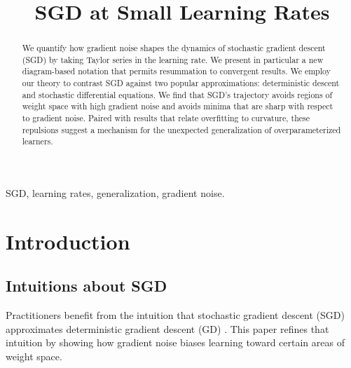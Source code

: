 \documentclass[final,12pt]{colt2021} %
\title[SGD at Small Learning Rates]{SGD at Small Learning Rates}
\begin{document}
    \maketitle
    
    \begin{abstract}%
        We quantify how gradient noise shapes the dynamics of stochastic
        gradient descent (SGD) by taking Taylor series in the learning rate.
        We present in particular a new diagram-based notation that permits
        resummation to convergent results.
        We employ our theory to contrast SGD against two popular
        approximations: deterministic descent and stochastic differential
        equations.  We find that SGD's trajectory avoids regions of weight
        space with high gradient noise and avoids minima that are sharp with
        respect to gradient noise.  Paired with results that relate overfitting
        to curvature, these repulsions suggest a mechanism for the unexpected
        generalization of overparameterized learners.
    \end{abstract}
    
    \begin{keywords}%
        SGD, learning rates, generalization, gradient noise. 
    \end{keywords}

    \section{Introduction}

        \subsection{Intuitions about SGD}

            Practitioners benefit from the intuition that stochastic gradient
            descent (SGD) approximates deterministic gradient descent (GD)
            \citep{bo91}.  This paper refines that intuition by showing
            how gradient noise biases learning toward certain areas of weight
            space.
\end{document}
